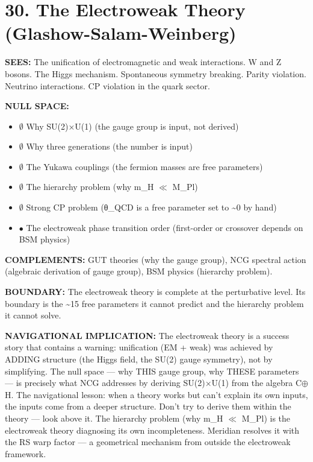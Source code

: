 \bigskip\noindent\makebox[\textwidth]{\color{rulegray}\rule{5cm}{0.3pt}}\bigskip


\section*{30. The Electroweak Theory (Glashow-Salam-Weinberg)}


\textbf{SEES:} The unification of electromagnetic and weak interactions. W and Z bosons. The Higgs mechanism. Spontaneous symmetry breaking. Parity violation. Neutrino interactions. CP violation in the quark sector.


\textbf{NULL SPACE:}

\begin{itemize}[nosep,leftmargin=*]
  \item $\emptyset$ Why SU(2)×U(1) (the gauge group is input, not derived)
  \item $\emptyset$ Why three generations (the number is input)
  \item $\emptyset$ The Yukawa couplings (the fermion masses are free parameters)
  \item $\emptyset$ The hierarchy problem (why m\_H $\ll$ M\_Pl)
  \item $\emptyset$ Strong CP problem (θ\_QCD is a free parameter set to \textasciitilde{}0 by hand)
  \item $\bullet$ The electroweak phase transition order (first-order or crossover depends on BSM physics)
\end{itemize}


\textbf{COMPLEMENTS:} GUT theories (why the gauge group), NCG spectral action (algebraic derivation of gauge group), BSM physics (hierarchy problem).


\textbf{BOUNDARY:} The electroweak theory is complete at the perturbative level. Its boundary is the \textasciitilde{}15 free parameters it cannot predict and the hierarchy problem it cannot solve.


\textbf{NAVIGATIONAL IMPLICATION:} The electroweak theory is a success story that contains a warning: unification (EM + weak) was achieved by ADDING structure (the Higgs field, the SU(2) gauge symmetry), not by simplifying. The null space — why THIS gauge group, why THESE parameters — is precisely what NCG addresses by deriving SU(2)×U(1) from the algebra C$\oplus$H. The navigational lesson: when a theory works but can't explain its own inputs, the inputs come from a deeper structure. Don't try to derive them within the theory — look above it. The hierarchy problem (why m\_H $\ll$ M\_Pl) is the electroweak theory diagnosing its own incompleteness. Meridian resolves it with the RS warp factor — a geometrical mechanism from outside the electroweak framework.


